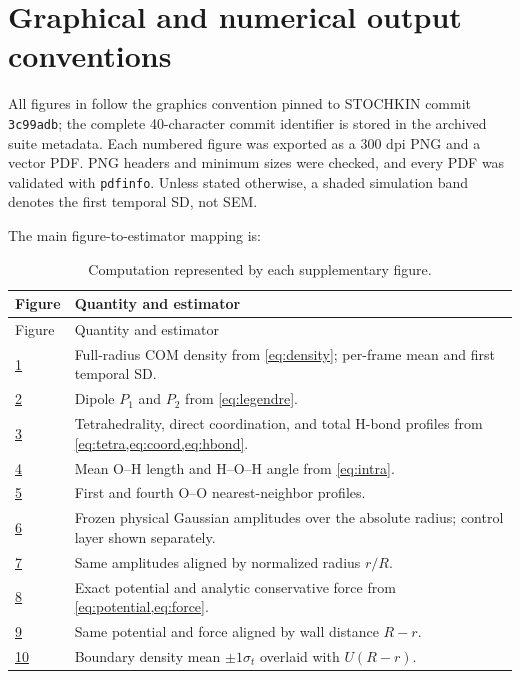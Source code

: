 \documentclass[11pt]{article}
\begin{document}
\section{Graphical and numerical output conventions}

All figures in  follow the graphics convention pinned to STOCHKIN commit
\texttt{3c99adb}; the complete 40-character commit identifier is stored in
the archived suite metadata.
Each numbered figure was exported as a 300 dpi PNG and a vector PDF.  PNG
headers and minimum sizes were checked, and every PDF was validated with
\texttt{pdfinfo}.  Unless stated otherwise, a shaded simulation band denotes
the first temporal SD, not SEM.

The main figure-to-estimator mapping is:
\begin{longtable}{p{}p{}}
\caption{Computation represented by each supplementary figure.}
\label{tab:figure-map}\\
\toprule
Figure & Quantity and estimator \\
\midrule
\endfirsthead
\toprule
Figure & Quantity and estimator \\
\midrule
\endhead
\hyperref[fig:s01-density]{1} & Full-radius COM density from \cref{eq:density}; per-frame mean and first temporal SD.\\
\hyperref[fig:s02-orientation]{2} & Dipole \(P_1\) and \(P_2\) from \cref{eq:legendre}.\\
\hyperref[fig:s03-network]{3} & Tetrahedrality, direct coordination, and total H-bond profiles from \cref{eq:tetra,eq:coord,eq:hbond}.\\
\hyperref[fig:s04-intramolecular]{4} & Mean O--H length and H--O--H angle from \cref{eq:intra}.\\
\hyperref[fig:s05-neighbors]{5} & First and fourth O--O nearest-neighbor profiles.\\
\hyperref[fig:s06-amplitudes]{6} & Frozen physical Gaussian amplitudes over the absolute radius; control layer shown separately.\\
\hyperref[fig:s07-amplitudes-normalized]{7} & Same amplitudes aligned by normalized radius \(r/R\).\\
\hyperref[fig:s08-potential-full]{8} & Exact potential and analytic conservative force from \cref{eq:potential,eq:force}.\\
\hyperref[fig:s09-potential-wall]{9} & Same potential and force aligned by wall distance \(R-r\).\\
\hyperref[fig:s10-density-potential]{10} & Boundary density mean \(\pm1\sigma_t\) overlaid with \(U(R-r)\).\\

\end{longtable}
\end{document}
